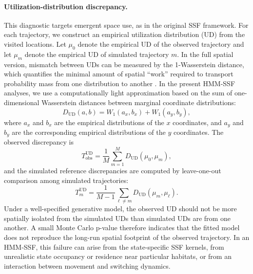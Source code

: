 \documentclass[11pt]{article}
\begin{document}
\paragraph{Utilization-distribution discrepancy.}
This diagnostic targets emergent space use, as in the original SSF framework.
For each trajectory, we construct an empirical utilization distribution (UD)
from the visited locations. Let $\mu_0$ denote the empirical UD of the observed
trajectory and let $\mu_m$ denote the empirical UD of simulated trajectory
$m$. In the full spatial version, mismatch between UDs can be measured by the
1-Wasserstein distance, which quantifies the minimal amount of spatial
``work'' required to transport probability mass from one distribution to
another \citep{villani2009}. In the present HMM-SSF analyses, we use a
computationally light approximation based on the sum of one-dimensional
Wasserstein distances between marginal coordinate distributions:
\begin{equation*}
  D_{\mathrm{UD}}(a,b)
  =
  W_1(a_x,b_x) + W_1(a_y,b_y),
\end{equation*}
where $a_x$ and $b_x$ are the empirical distributions of the $x$ coordinates,
and $a_y$ and $b_y$ are the corresponding empirical distributions of the $y$
coordinates. The observed discrepancy is
\begin{equation*}
  T_{\mathrm{obs}}^{\mathrm{UD}}
  =
  \frac{1}{M}\sum_{m=1}^{M} D_{\mathrm{UD}}(\mu_0,\mu_m),
\end{equation*}
and the simulated reference discrepancies are computed by leave-one-out
comparison among simulated trajectories:
\begin{equation*}
  T_m^{\mathrm{UD}}
  =
  \frac{1}{M-1}
  \sum_{\ell \ne m} D_{\mathrm{UD}}(\mu_m,\mu_\ell).
\end{equation*}
Under a well-specified generative model, the observed UD should not be more
spatially isolated from the simulated UDs than simulated UDs are from one
another. A small Monte Carlo p-value therefore indicates that the fitted model
does not reproduce the long-run spatial footprint of the observed trajectory.
In an HMM-SSF, this failure can arise from the state-specific SSF kernels, from
unrealistic state occupancy or residence near particular habitats, or from an
interaction between movement and switching dynamics.
\end{document}

